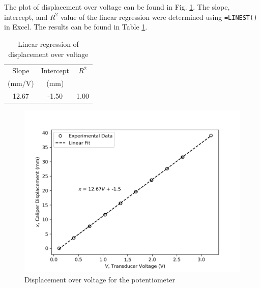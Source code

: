 \section{}


\subsection{}

The plot of displacement over voltage can be found in Fig. \ref{fig:Q1a}. The slope, intercept, and $R^2$ value of the linear regression 
were determined using \texttt{=LINEST()} in Excel. The results can be found in Table \ref{tab:Q1a}.

\begin{table}[h]
    \centering
    \caption{Linear regression of displacement over voltage}
    \label{tab:Q1a}
    \begin{tabular}{ccc}
        \hline
        Slope & Intercept & $R^2$ \\
        (mm/V) & (mm) & \\
        \midrule
        12.67 & -1.50 & 1.00 \\
        \hline
    \end{tabular}
\end{table}

\begin{figure}[h]
    \centering
    \includegraphics[width=0.8\linewidth]{matplotlib/Q1a.png}
    \caption{Displacement over voltage for the potentiometer}
    \label{fig:Q1a}
\end{figure}

